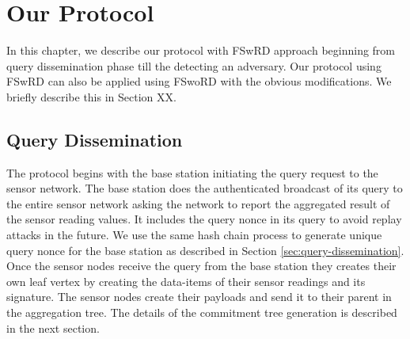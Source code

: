 \chapter{Our Protocol}
	In this chapter, we describe our protocol with FSwRD approach beginning from query dissemination phase till the detecting an adversary.
	Our protocol using FSwRD can also be applied using FSwoRD with the obvious modifications. 
	We briefly describe this in Section XX.


\section{Query Dissemination}
	The protocol begins with the base station initiating the query request to the sensor network.
	The base station does the authenticated broadcast of its query to the entire sensor network asking the network to report the aggregated result of the sensor reading values.
	It includes the query nonce in its query to avoid replay attacks in the future. 
	We use the same hash chain process to generate unique query nonce for the base station as described in Section \ref{sec:query-dissemination}.
	Once the sensor nodes receive the query from the base station they creates their own leaf vertex by creating the data-items of their sensor readings and its signature.
	The sensor nodes create their payloads and send it to their parent in the aggregation tree. 
	The details of the commitment tree generation is described in the next section.


